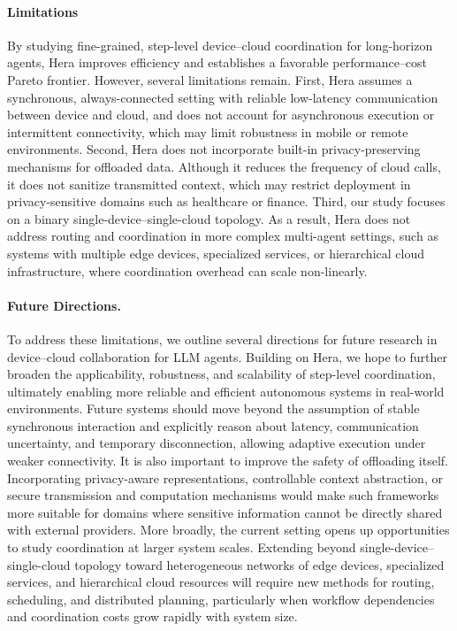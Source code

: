 \documentclass{article}
\newcommand{\name}{Hera\xspace}
\begin{document}
\paragraph{Limitations}
By studying fine-grained, step-level device--cloud coordination for long-horizon agents, \name improves efficiency and establishes a favorable performance--cost Pareto frontier. However, several limitations remain. First, \name assumes a synchronous, always-connected setting with reliable low-latency communication between device and cloud, and does not account for asynchronous execution or intermittent connectivity, which may limit robustness in mobile or remote environments. Second, \name does not incorporate built-in privacy-preserving mechanisms for offloaded data. Although it reduces the frequency of cloud calls, it does not sanitize transmitted context, which may restrict deployment in privacy-sensitive domains such as healthcare or finance. Third, our study focuses on a binary single-device--single-cloud topology. As a result, \name does not address routing and coordination in more complex multi-agent settings, such as systems with multiple edge devices, specialized services, or hierarchical cloud infrastructure, where coordination overhead can scale non-linearly.

\paragraph{Future Directions.}
To address these limitations, we outline several directions for future research in device--cloud collaboration for LLM agents. Building on \name, we hope to further broaden the applicability, robustness, and scalability of step-level coordination, ultimately enabling more reliable and efficient autonomous systems in real-world environments. Future systems should move beyond the assumption of stable synchronous interaction and explicitly reason about latency, communication uncertainty, and temporary disconnection, allowing adaptive execution under weaker connectivity. It is also important to improve the safety of offloading itself. Incorporating privacy-aware representations, controllable context abstraction, or secure transmission and computation mechanisms would make such frameworks more suitable for domains where sensitive information cannot be directly shared with external providers. More broadly, the current setting opens up opportunities to study coordination at larger system scales. Extending beyond single-device--single-cloud topology toward heterogeneous networks of edge devices, specialized services, and hierarchical cloud resources will require new methods for routing, scheduling, and distributed planning, particularly when workflow dependencies and coordination costs grow rapidly with system size.
\end{document}
